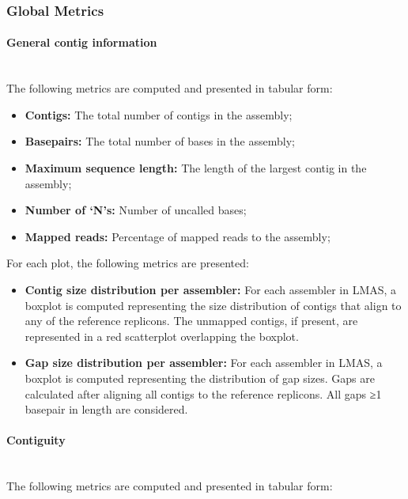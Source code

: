 \subsubsection{Global Metrics} \label{ch5_supmaterial_metrics_global}

\paragraph{General contig information} \mbox{}\\

The following metrics are computed and presented in tabular form: 

\begin{itemize}
    \item \textbf{Contigs:} The total number of contigs in the assembly;
    \item \textbf{Basepairs:} The total number of bases in the assembly;
    \item \textbf{Maximum sequence length:} The length of the largest contig in the assembly;
    \item \textbf{Number of ‘N’s:} Number of uncalled bases;
    \item \textbf{Mapped reads:} Percentage of mapped reads to the assembly;
\end{itemize}

For each plot, the following metrics are presented:

\begin{itemize}
    \item \textbf{Contig size distribution per assembler:} For each assembler in LMAS, a boxplot is computed representing the size distribution of contigs that align to any of the reference replicons. The unmapped contigs, if present, are represented in a red scatterplot overlapping the boxplot. 
    \item \textbf{Gap size distribution per assembler:} For each assembler in LMAS, a boxplot is computed representing the distribution of gap sizes. Gaps are calculated after aligning all contigs to the reference replicons. All gaps ≥1 basepair in length are considered. 
\end{itemize}

\paragraph{Contiguity} \mbox{}\\

The following metrics are computed and presented in tabular form:

